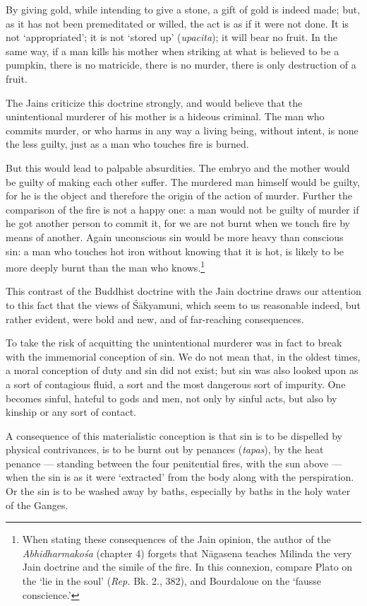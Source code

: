\documentclass[a4paper, 11pt, oneside, english, landscape]{article}
\begin{document}
By giving gold, while intending to give a stone, a gift of gold is indeed made; but, as it has not been premeditated or willed, the act is as if it were not done. It is not `appropriated'; it is not `stored up' (\emph{upacita}); it will bear no fruit. In the same way, if a man kills his mother when striking at what is believed to be a pumpkin, there is no matricide, there is no murder, there is only destruction of a fruit.

The Jains criticize this doctrine strongly, and would believe that the unintentional murderer of his mother is a hideous criminal. The man who commits murder, or who harms in any way a living being, without intent, is none the less guilty, just as a man who touches fire is burned.

But this would lead to palpable absurdities. The embryo and the mother would be guilty of making each other suffer. The murdered man himself would be guilty, for he is the object and therefore the origin of the action of murder. Further the comparison of the fire is not a happy one: a man would not be guilty of murder if he got another person to commit it, for we are not burnt when we touch fire by means of another. Again unconscious sin would be more heavy than conscious sin: a man who touches hot iron without knowing that it is hot, is likely to be more deeply burnt than the man who knows.\footnote{When stating these consequences of the Jain opinion, the author of the \emph{Abhidharmakośa} (chapter 4) forgets that Nāgasena teaches Milinda the very Jain doctrine and the simile of the fire. In this connexion, compare Plato on the `lie in the soul' (\emph{Rep.} Bk. 2., 382), and Bourdaloue on the `fausse conscience.'}

This contrast of the Buddhist doctrine with the Jain doctrine draws our attention to this fact that the views of Śākyamuni, which seem to us reasonable indeed, but rather evident, were bold and new, and of far-reaching consequences.

To take the risk of acquitting the unintentional murderer was in fact to break with the immemorial conception of sin. We do not mean that, in the oldest times, a moral conception of duty and sin did not exist; but sin was also looked upon as a sort of contagious fluid, a sort and the most dangerous sort of impurity. One becomes sinful, hateful to gods and men, not only by sinful acts, but also by kinship or any sort of contact.

A consequence of this materialistic conception is that sin is to be dispelled by physical contrivances, is to be burnt out by penances (\emph{tapas}), by the heat penance --- standing between the four penitential fires, with the sun above --- when the sin is as it were `extracted' from the body along with the perspiration. Or the sin is to be washed away by baths, especially by baths in the holy water of the Ganges.
\end{document}

